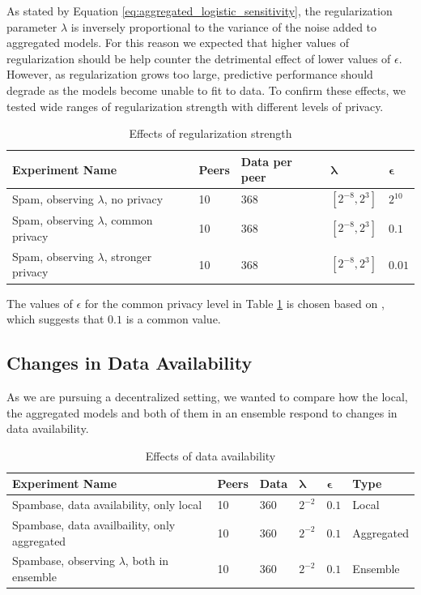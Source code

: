 As stated by Equation \ref{eq:aggregated_logistic_sensitivity}, the regularization parameter $\lambda$ is inversely proportional to the variance of the noise added to aggregated models. For this reason we expected that higher values of regularization should be help counter the detrimental effect of lower values of $\epsilon$. However, as regularization grows too large, predictive performance should degrade as the models become unable to fit to data. To confirm these effects, we tested wide ranges of regularization strength with different levels of privacy.

\begin{table}[h]
	\centering
	\caption{Effects of regularization strength}
	\label{tab:experiments_regularization_strength}
	\begin{tabular}{|l|l|l|l|l|}
		\textbf{Experiment Name}    & \textbf{Peers} & \textbf{Data per peer} & $\boldsymbol{\lambda}$         & $\boldsymbol{\epsilon}$ \\
		\hline
		Spam, observing $\lambda$, no privacy       & 10    & 368  & $[2^{-8}, 2^{3}]$ & $2^{10}$   \\
		Spam, observing $\lambda$, common privacy   & 10    & 368  & $[2^{-8}, 2^{3}]$ & $0.1$      \\
		Spam, observing $\lambda$, stronger privacy & 10    & 368  & $[2^{-8}, 2^{3}]$ & $0.01$    
	\end{tabular}
\end{table}

The values of $\epsilon$ for the  common privacy level in Table \ref{tab:experiments_regularization_strength} is chosen based on \cite{dwork2008differential}, which suggests that $0.1$ is a common value.

\subsection{Changes in Data Availability}

As we are pursuing a decentralized setting, we wanted to compare how the local, the aggregated models and both of them in an ensemble respond to changes in data availability.

\begin{table}[h]
	\centering
	\caption{Effects of data availability}
	\label{tab:experiments_data_availability}
	\begin{tabular}{|l|l|l|l|l|l|}
		\textbf{Experiment Name}                                 & \textbf{Peers} & \textbf{Data} & $\boldsymbol{\lambda}$ & $\boldsymbol{\epsilon}$ & \textbf{Type}       \\
		\hline
		Spambase, data availability, only local         & 10    & 360  & $2^{-2}$  & $0.1$      & Local      \\
		Spambase, data availbaility, only aggregated    & 10    & 360  & $2^{-2}$  & $0.1$      & Aggregated \\
		Spambase, observing $\lambda$, both in ensemble & 10    & 360  & $2^{-2}$  & $0.1$      & Ensemble  
	\end{tabular}
\end{table}

